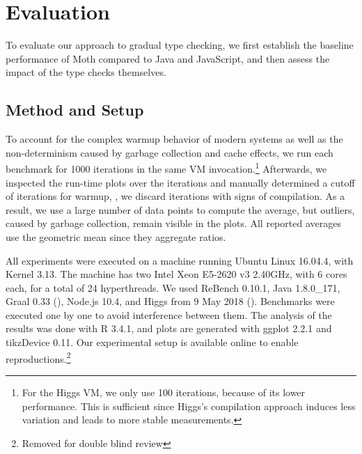 
\section{Evaluation}
\label{sec:evaluation}

\newcommand{\NumIterationsAll}{1000\xspace}
\newcommand{\NumIterationsHiggs}{100\xspace}


To evaluate our approach to gradual type checking,
we first establish the baseline performance of Moth
compared to Java and JavaScript,
and then assess the impact of the type checks themselves.

\subsection{Method and Setup}

To account for the complex warmup behavior
of modern systems\citep{Barrett:2017:VMW} as well as
the non-determinism caused by \eg garbage collection and cache effects,
we run each benchmark for \NumIterationsAll iterations in the same
VM invocation.\footnote{
For the Higgs VM, we only use \NumIterationsHiggs iterations,
because of its lower performance.
This is sufficient since Higgs's compilation approach induces less variation
and leads to more stable measurements.}
Afterwards, we inspected the run-time plots over the iterations
and manually determined a cutoff of \WarmupCutOff iterations for warmup,
\ie, we discard iterations with signs of compilation.
As a result, we use a large number of data points to compute the average,
but outliers, caused by \eg garbage collection, remain visible in the plots.
All reported averages use the geometric mean since they aggregate ratios.

%
All experiments were executed on a machine running Ubuntu Linux 16.04.4,
with Kernel 3.13.
The machine has two Intel Xeon E5-2620 v3 2.40GHz,
with 6 cores each, for a total of 24 hyperthreads.
We used ReBench 0.10.1\citep{ReBench:2018}, Java 1.8.0\_171, Graal 0.33 (),
Node.js 10.4, and Higgs from 9 May 2018 ().
Benchmarks were executed one by one to avoid interference between them.
The analysis of the results was done with R 3.4.1,
and plots are generated with ggplot 2.2.1 and tikzDevice 0.11.
Our experimental setup is available online to enable reproductions.\footnote{
Removed for double blind review
}


